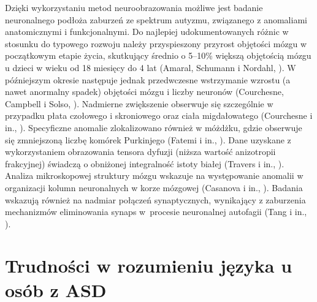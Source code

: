     Dzięki wykorzystaniu metod neuroobrazowania możliwe jest badanie neuronalnego podłoża zaburzeń ze spektrum autyzmu, związanego z anomaliami anatomicznymi i funkcjonalnymi.
    Do najlepiej udokumentowanych różnic w stosunku do typowego rozwoju należy przyspieszony przyrost objętości mózgu w początkowym etapie życia, skutkujący średnio o 5--10\% większą objętością mózgu u dzieci w wieku od 18 miesięcy do 4 lat (Amaral, Schumann i Nordahl, \cite*{amaral2008neuroanatomy}).
    W późniejszym okresie następuje jednak przedwczesne wstrzymanie wzrostu (a nawet anormalny spadek) objętości mózgu i liczby neuronów (Courchesne, Campbell i Solso, \cite*{courchesne2011brain}).
    Nadmierne zwiększenie obserwuje się szczególnie w przypadku płata czołowego i skroniowego oraz ciała migdałowatego (Courchesne i in., \cite*{courchesne2011brain}).
    Specyficzne anomalie zlokalizowano również w móżdżku, gdzie obserwuje się zmniejszoną liczbę komórek Purkinjego (Fatemi i in., \cite*{fatemi2012consensus}).
    Dane uzyskane z wykorzystaniem obrazowania tensora dyfuzji (niższa wartość anizotropii frakcyjnej) świadczą o obniżonej integralność istoty białej (Travers i in., \cite*{travers2012diffusion}).
    Analiza mikroskopowej struktury mózgu wskazuje na występowanie anomalii w organizacji kolumn neuronalnych w korze mózgowej (Casanova i in., \cite*{casanova2006minicolumnar}).
    Badania wskazują również na nadmiar połączeń synaptycznych, wynikający z zaburzenia mechanizmów eliminowania synaps w~procesie neuronalnej autofagii (Tang i in., \cite*{tang2014loss}). 

\section{Trudności w rozumieniu języka u osób z ASD}

    
    
    
